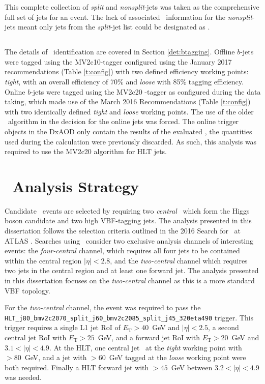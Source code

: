 		This complete collection of \textit{split} and \textit{nonsplit}-jets was taken as the comprehensive full set of jets for an event. The lack of associated \btag\ information for the \textit{nonsplit}-jets meant only jets from the \textit{split}-jet list could be designated as \bjets.

		\subsection{\bjets}

		The details of \bjet\ identification are covered in Section \ref{det:btagging}. Offline $b$-jets were tagged using the MV2c10-tagger configured using the January 2017 recommendations (Table \ref{t:config}) with two defined efficiency working points: \textit{tight}, with an overall efficiency of 70\% and \textit{loose} with 85\% tagging efficiency. Online $b$-jets were tagged using the MV2c20
		-tagger as configured during the data taking, which made use of the March 2016 Recommendations (Table \ref{t:config}) with two identically defined \textit{tight} and \textit{loose} working points. The use of the older \btagging\ algorithm in the decision for the online jets was forced. The online trigger objects in the DxAOD only contain the results of the evaluated \btag, the quantities used during the calculation were previously discarded. As such, this analysis was required to use the MV2c20 algorithm for HLT jets.


	\section{\VBFHBB\, Analysis Strategy}


	\label{es:as}
		Candidate \VBFHBB\, events are selected by requiring two \textit{central} \bjets\, which form the Higgs boson candidate and two high \pt VBF-tagging jets. The analysis presented in this dissertation follows the selection criteria outlined in the 2016 Search for \VBFHBB\ at ATLAS \cite{VBFHbb8tev}. Searches using \VBFHBB\, consider two exclusive analysis channels of interesting events: the \textit{four-central} channel, which requires all four jets to be contained within the central region $|\eta| < 2.8$, and the \textit{two-central} channel which requires two jets in the central region and at least one forward jet.
		The analysis presented in this dissertation focuses on the \textit{two-central} channel as this is a more standard VBF topology.

		For the \textit{two-central} channel, the event was required to pass the \texttt{HLT\_j80\_bmv2c2070\_split\_\-j60\_bmv2c2085\_split\_j45\_320eta490} trigger. This trigger requires a single L1 jet RoI of $E_\text{T} > 40$~GeV and $|\eta| < 2.5$, a second central jet RoI with $E_\text{T} > 25$~GeV, and a forward jet RoI with $E_\text{T} > 20$~GeV and $3.1 < |\eta| < 4.9$.
		At the HLT, one central jet \btagged\, at the \textit{tight} working point with \pt $>80$~GeV, and a jet with \pt$>60$~GeV tagged at the \textit{loose} working point were both required. Finally a HLT forward jet with \pt$>45$~GeV between $3.2 < |\eta| < 4.9$ was needed.

